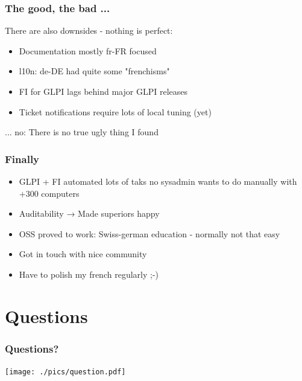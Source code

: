 \documentclass{beamer}
\begin{document}
\begin{frame}
    \frametitle{The good, the bad ...}
    There are also downsides - nothing is perfect:
    \begin{itemize}
	\item Documentation mostly fr-FR focused
	\item l10n: de-DE had quite some "frenchisms"
	\item FI for GLPI lags behind major GLPI releases
	\item Ticket notifications require lots of local tuning (yet)
    \end{itemize}
    ... no: There is no true ugly thing I found
\end{frame}

\begin{frame}
    \frametitle{Finally}
    \begin{itemize}
	\item GLPI + FI automated lots of taks no sysadmin wants to do manually with +300 computers
	\item Auditability →  Made superiors happy
	\item OSS proved to work: Swiss-german education - normally not that easy
	\item Got in touch with nice community
	\item Have to polish my french regularly ;-)
    \end{itemize}
\end{frame}

\section{Questions}

\begin{frame}
    \frametitle{Questions?}

    \begin{center}

    \texttt{[image: ./pics/question.pdf]}

    \end{center}

\end{frame}
\end{document}
